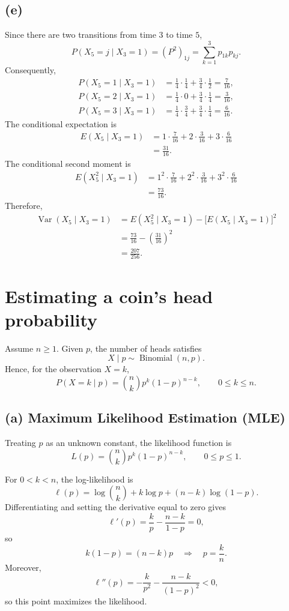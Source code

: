 \documentclass[11pt,a4paper]{article}
\begin{document}
\subsection*{(e)} Since there are two transitions from time \(3\)
to time \(5\),
\[
P(X_5=j\mid X_3=1)=(P^2)_{1j}
=\sum_{k=1}^{3}p_{1k}p_{kj}.
\]
Consequently,
\[
\begin{aligned}
P(X_5=1\mid X_3=1)
&=\frac14\cdot\frac14+\frac34\cdot\frac12
=\frac7{16},\\[3pt]
P(X_5=2\mid X_3=1)
&=\frac14\cdot0+\frac34\cdot\frac14
=\frac3{16},\\[3pt]
P(X_5=3\mid X_3=1)
&=\frac14\cdot\frac34+\frac34\cdot\frac14
=\frac6{16}.
\end{aligned}
\]
The conditional expectation is
\[
\begin{aligned}
E(X_5\mid X_3=1)
&=1\cdot\frac7{16}
+2\cdot\frac3{16}
+3\cdot\frac6{16}\\
&=\frac{31}{16}.
\end{aligned}
\]
The conditional second moment is
\[
\begin{aligned}
E(X_5^2\mid X_3=1)
&=1^2\cdot\frac7{16}
+2^2\cdot\frac3{16}
+3^2\cdot\frac6{16}\\
&=\frac{73}{16}.
\end{aligned}
\]
Therefore,
\[
\begin{aligned}
\operatorname{Var}(X_5\mid X_3=1)
&=E(X_5^2\mid X_3=1)
-\bigl[E(X_5\mid X_3=1)\bigr]^2\\
&=\frac{73}{16}-\left(\frac{31}{16}\right)^2\\
&=\frac{207}{256}.
\end{aligned}
\]
\section{Estimating a coin's head probability}
Assume $n\geq 1$. Given $p$, the number of heads satisfies
\[
X\mid p\sim \operatorname{Binomial}(n,p).
\]
Hence, for the observation $X=k$,
\[
P(X=k\mid p)=\binom{n}{k}p^k(1-p)^{n-k},
\qquad 0\leq k\leq n.
\]

\subsection*{(a) Maximum Likelihood Estimation (MLE)}

Treating $p$ as an unknown constant, the likelihood function is
\[
L(p)=\binom{n}{k}p^k(1-p)^{n-k},
\qquad 0\leq p\leq 1.
\]

For $0<k<n$, the log-likelihood is
\[
\ell(p)=\log\binom{n}{k}+k\log p+(n-k)\log(1-p).
\]
Differentiating and setting the derivative equal to zero gives
\[
\ell'(p)=\frac{k}{p}-\frac{n-k}{1-p}=0,
\]
so
\[
k(1-p)=(n-k)p
\quad\Longrightarrow\quad
p=\frac{k}{n}.
\]
Moreover,
\[
\ell''(p)
=-\frac{k}{p^2}-\frac{n-k}{(1-p)^2}<0,
\]
so this point maximizes the likelihood.
\end{document}
